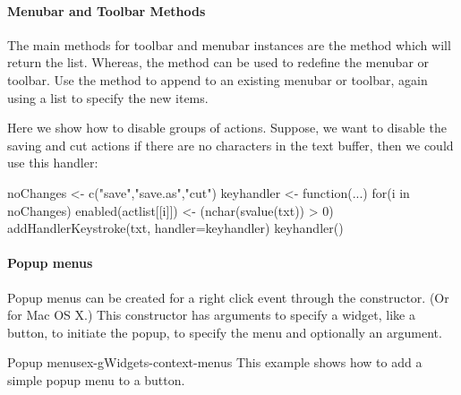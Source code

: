\paragraph{Menubar and Toolbar Methods}
The main methods for toolbar and menubar instances are
the  method which will return the list. Whereas, the
 method can be used to redefine the
menubar or toolbar. Use the  method to append to an
existing menubar or toolbar, again using a list to specify the new items.


Here we show how to disable groups of actions. Suppose, we want to
disable the saving and cut actions if there are no characters in the
text buffer, then we could use this handler:

\begin{Schunk}
\begin{Sinput}
 noChanges <- c("save","save.as","cut")
 keyhandler <- function(...) {
   for(i in noChanges)
     enabled(actlist[[i]]) <- (nchar(svalue(txt)) > 0)
 }
 addHandlerKeystroke(txt, handler=keyhandler)
 keyhandler()
\end{Sinput}
\end{Schunk}


\paragraph{Popup menus}

Popup menus can be created for a right click event through the
 constructor. (Or
 for Mac OS X.) This constructor has arguments
 to specify a widget, like a button, to initiate the popup,
 to specify the menu and optionally an
 argument.


\begin{example}{Popup menus}{ex-gWidgets-context-menus}
  This example shows how to add a simple popup menu to a button.
\begin{Schunk}
\end{Schunk}

\end{example}












